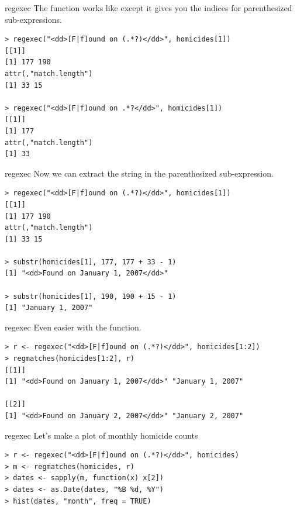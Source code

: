 \documentclass[aspectratio=169]{beamer}
\begin{document}
\begin{frame}[fragile]{regexec}
The  function works like  except it gives
you the indices for parenthesized sub-expressions.
\begin{verbatim}
> regexec("<dd>[F|f]ound on (.*?)</dd>", homicides[1])
[[1]]
[1] 177 190
attr(,"match.length")
[1] 33 15

> regexec("<dd>[F|f]ound on .*?</dd>", homicides[1])
[[1]]
[1] 177
attr(,"match.length")
[1] 33
\end{verbatim}
\end{frame}


\begin{frame}[fragile]{regexec}
  Now we can extract the string in the parenthesized sub-expression.
\begin{verbatim}
> regexec("<dd>[F|f]ound on (.*?)</dd>", homicides[1])
[[1]]
[1] 177 190
attr(,"match.length")
[1] 33 15

> substr(homicides[1], 177, 177 + 33 - 1)
[1] "<dd>Found on January 1, 2007</dd>"

> substr(homicides[1], 190, 190 + 15 - 1)
[1] "January 1, 2007"
\end{verbatim}
\end{frame}

\begin{frame}[fragile]{regexec}
Even easier with the  function.
\begin{verbatim}
> r <- regexec("<dd>[F|f]ound on (.*?)</dd>", homicides[1:2])
> regmatches(homicides[1:2], r)
[[1]]
[1] "<dd>Found on January 1, 2007</dd>" "January 1, 2007"                  

[[2]]
[1] "<dd>Found on January 2, 2007</dd>" "January 2, 2007"
\end{verbatim}
\end{frame}

\begin{frame}[fragile]{regexec}
Let's make a plot of monthly homicide counts
\begin{verbatim}
> r <- regexec("<dd>[F|f]ound on (.*?)</dd>", homicides)
> m <- regmatches(homicides, r)
> dates <- sapply(m, function(x) x[2])
> dates <- as.Date(dates, "%B %d, %Y")
> hist(dates, "month", freq = TRUE)
\end{verbatim}
\end{frame}
\end{document}
